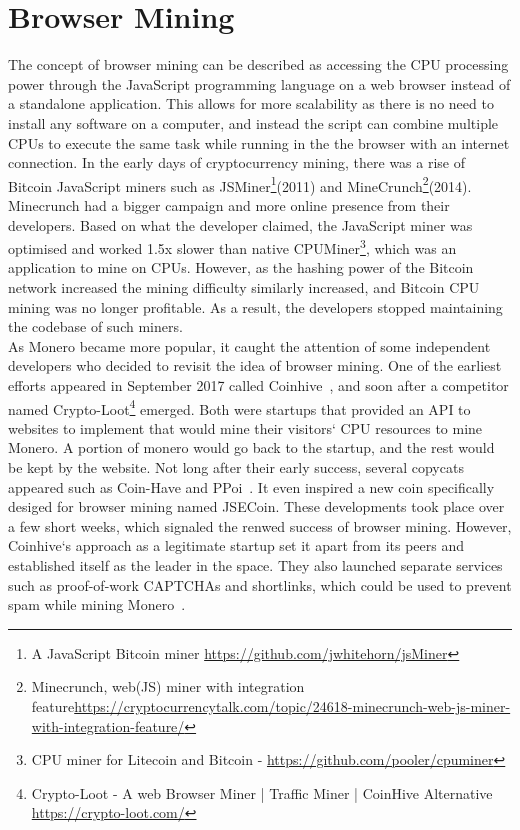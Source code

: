 \section{Browser Mining}
The concept of browser mining can be described as accessing the CPU processing power through the JavaScript programming language on a web browser instead of a standalone application. This allows for more scalability as there is no need to install any software on a computer, and instead the script can combine multiple CPUs to execute the same task while running in the the browser with an internet connection. In the early days of cryptocurrency mining, there was a rise of Bitcoin JavaScript miners such as JSMiner\footnote{A JavaScript Bitcoin miner \url{https://github.com/jwhitehorn/jsMiner}}(2011) and MineCrunch\footnote{Minecrunch, web(JS) miner with integration feature\url{https://cryptocurrencytalk.com/topic/24618-minecrunch-web-js-miner-with-integration-feature/}}(2014). Minecrunch had a bigger campaign and more online presence from their developers. Based on what the developer claimed, the JavaScript miner was optimised and worked 1.5x slower than native CPUMiner\footnote{CPU miner for Litecoin and Bitcoin - \url{https://github.com/pooler/cpuminer}}, which was an application to mine on CPUs. However, as the hashing power of the Bitcoin network increased the mining difficulty similarly increased, and Bitcoin CPU mining was no longer profitable. As a result, the developers stopped maintaining the codebase of such miners.
\\
As Monero became more popular, it caught the attention of some independent developers who decided to revisit the idea of browser mining. One of the earliest efforts appeared in September 2017 called Coinhive~\cite{coinhive}, and soon after a competitor named Crypto-Loot\footnote{Crypto-Loot - A web Browser Miner | Traffic Miner | CoinHive Alternative \url{https://crypto-loot.com/}} emerged. Both were startups that provided an API to websites to implement that would mine their visitors` CPU resources to mine Monero. A portion of monero would go back to the startup, and the rest would be kept by the website. Not long after their early success, several copycats appeared such as Coin-Have and PPoi~\cite{coinhivecopycats}. It even inspired a new coin specifically desiged for browser mining named JSECoin. These developments took place over a few short weeks, which signaled the renwed success of browser mining. However, Coinhive`s approach as a legitimate startup set it apart from its peers and established itself as the leader in the space. They also launched separate services such as proof-of-work CAPTCHAs and shortlinks, which could be used to prevent spam while mining Monero~\cite{coinhive}.

